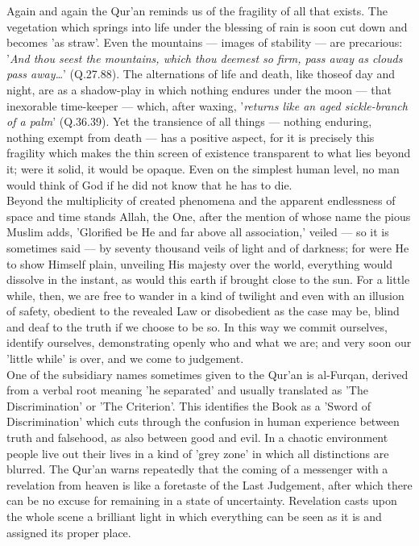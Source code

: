 \documentclass[11pt, b5paper, twoside]{book}
\begin{document}
Again and again the Qur'an reminds us of the fragility of all that exists. The vegetation which 
springs into life under the blessing of rain is soon cut down and becomes 'as straw'. Even the 
mountains --- images of stability --- are precarious: '\emph{And thou seest the mountains, which thou deemest so firm, pass away as clouds pass away\ldots{}}' (Q.27.88). The alternations of life and death, like thoseof day and night, are as a shadow-play in which nothing endures under the moon --- that inexorable time-keeper --- which, after waxing, '\emph{returns like an aged sickle-branch of a palm}' (Q.36.39). Yet the transience of all things --- nothing enduring, nothing exempt from death --- has a positive aspect, for it is precisely this fragility which makes the thin screen of existence transparent to what lies beyond it; were it solid, it would be opaque. Even on the simplest human level, no man would think of God if he did not know that he has to die. \\

Beyond the multiplicity of created phenomena and the apparent endlessness of space and time stands 
Allah, the One, after the mention of whose name the pious Muslim adds, 'Glorified be He and far above 
all association,' veiled --- so it is sometimes said --- by seventy thousand veils of light and of 
darkness; for were He to show Himself plain, unveiling His majesty over the world, everything would 
dissolve in the instant, as would this earth if brought close to the sun. For a little while, then, 
we are free to wander in a kind of twilight and even with an illusion of safety, obedient to the 
revealed Law or disobedient as the case may be, blind and deaf to the truth if we choose to be so. In 
this way we commit ourselves, identify ourselves, demonstrating openly who and what we are; and very 
soon our 'little while' is over, and we come to judgement. \\

One of the subsidiary names sometimes given to the Qur'an is al-Furqan, derived from a verbal root 
meaning 'he separated' and usually translated as 'The Discrimination' or 'The Criterion'. This 
identifies the Book as a 'Sword of Discrimination' which cuts through the confusion in human 
experience between truth and falsehood, as also between good and evil. In a chaotic environment 
people live out their lives in a kind of 'grey zone' in which all distinctions are blurred. The 
Qur'an warns repeatedly that the coming of a messenger with a revelation from heaven is like a 
foretaste of the Last Judgement, after which there can be no excuse for remaining in a state of 
uncertainty. Revelation casts upon the whole scene a brilliant light in which everything can be seen 
as it is and assigned its proper place. \\
\end{document}
